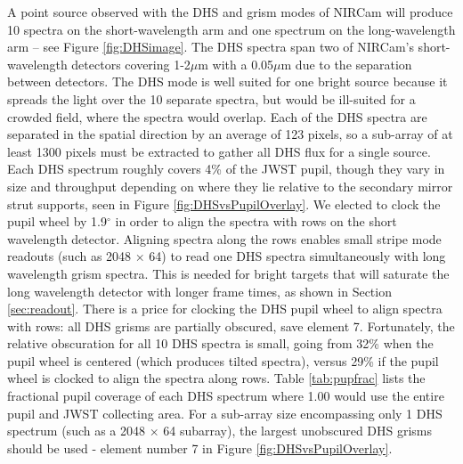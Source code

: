 \documentclass[iop]{emulateapj}
\begin{document}
A point source observed with the DHS and grism modes of NIRCam will produce 10 spectra on the short-wavelength arm and one spectrum on the long-wavelength arm -- see Figure \ref{fig:DHSimage}.
The DHS spectra span two of NIRCam's short-wavelength detectors covering 1-2$\mu$m with a 0.05$\mu$m due to the separation between detectors.
The DHS mode is well suited for one bright source because it spreads the light over the 10 separate spectra, but would be ill-suited for a crowded field, where the spectra would overlap.
Each of the DHS spectra are separated in the spatial direction by an average of 123 pixels, so a sub-array of at least 1300 pixels must be extracted to gather all DHS flux for a single source.
Each DHS spectrum roughly covers 4\% of the JWST pupil, though they vary in size and throughput depending on where they lie relative to the secondary mirror strut supports, seen in Figure \ref{fig:DHSvsPupilOverlay}.
We elected to clock the pupil wheel by 1.9$^\circ$ in order to align the spectra with rows on the short wavelength detector.
Aligning spectra along the rows enables small stripe mode readouts (such as 2048 $\times$ 64) to read one DHS spectra simultaneously with long wavelength grism spectra.
This is needed for bright targets that will saturate the long wavelength detector with longer frame times, as shown in Section \ref{sec:readout}.
There is a price for clocking the DHS pupil wheel to align spectra with rows: all DHS grisms are partially obscured, save element 7.
Fortunately, the relative obscuration for all 10 DHS spectra is small, going from 32\% when the pupil wheel is centered (which produces tilted spectra), versus 29\% if the pupil wheel is clocked to align the spectra along rows.
Table \ref{tab:pupfrac} lists the fractional pupil coverage of each DHS spectrum where 1.00 would use the entire pupil and JWST collecting area.
For a sub-array size encompassing only 1 DHS spectrum (such as a 2048 $\times$ 64 subarray), the largest unobscured DHS grisms should be used - element number 7 in Figure \ref{fig:DHSvsPupilOverlay}.
\end{document}
